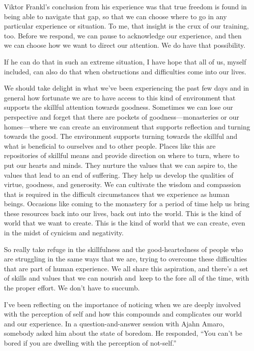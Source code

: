 \enlargethispage{1\baselineskip}
Viktor Frankl's conclusion from his experience was that true freedom is found in being able to navigate that gap, so that we can choose where to go in any particular experience or situation. To me, that insight is the crux of our training, too. Before we respond, we can pause to acknowledge our experience, and then we can choose how we want to direct our attention. We do have that possibility.

If he can do that in such an extreme situation, I have hope that all of us, myself included, can also do that when obstructions and difficulties come into our lives.

We should take delight in what we've been experiencing the past few days and in general how fortunate we are to have access to this kind of environment that supports the skillful attention towards goodness. Sometimes we can lose our perspective and forget that there are pockets of goodness---monasteries or our homes---where we can create an environment that supports reflection and turning towards the good. The environment supports turning towards the skillful and what is beneficial to ourselves and to other people. Places like this are repositories of skillful means and provide direction on where to turn, where to put our hearts and minds. They nurture the values that we can aspire to, the values that lead to an end of suffering. They help us develop the qualities of virtue, goodness, and generosity. We can cultivate the wisdom and compassion that is required in the difficult circumstances that we experience as human beings. Occasions like coming to the monastery for a period of time help us bring these resources back into our lives, back out into the world. This is the kind of world that we want to create. This is the kind of world that we can create, even in the midst of cynicism and negativity.

\enlargethispage{1\baselineskip}
So really take refuge in the skillfulness and the good-heartedness of people who are struggling in the same ways that we are, trying to overcome these difficulties that are part of human experience. We all share this aspiration, and there's a set of skills and values that we can nourish \mbox{and keep} to the fore all of the time, with the proper effort. We don't have to succumb.

I've been reflecting on the importance of noticing when we are deeply involved with the perception of self and how this compounds and complicates our world and our experience. In a question-and-answer session with Ajahn Amaro, somebody asked him about the state of boredom. He responded, ``You can't be bored if you are dwelling with the perception of not-self.''

